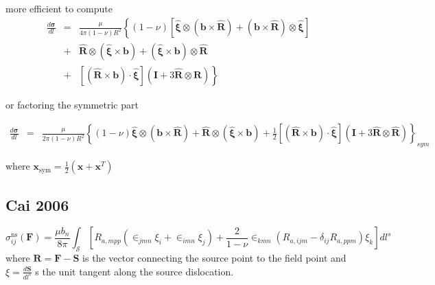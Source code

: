 \documentclass[10pt]{report}
\begin{document}
{more efficient to compute
\begin{eqnarray}
\frac{d\bm \sigma}{dl}&=&\frac{\mu}{4\pi (1-\nu)R^2}\left\{(1-\nu)\left[\hat{\bm\xi}\otimes(\bm b\times \hat{\bm R})+(\bm b\times \hat{\bm R})\otimes\hat{\bm\xi}\right]\right.\nonumber\\
&+&\left.\hat{\bm R}\otimes(\hat{\bm\xi}\times\bm b)+(\hat{\bm\xi}\times\bm b)\otimes\hat{\bm R}\right.\nonumber\\
&+&\left. \left[(\hat{\bm R}\times\bm b)\cdot\hat{\bm\xi}\right]\left(\bm I + 3\hat{\bm R}\otimes\hat{\bm R} \right)\right\}
\end{eqnarray}



or factoring the symmetric part

\begin{eqnarray}
\frac{d\bm \sigma}{dl}&=&\frac{\mu}{2\pi (1-\nu)R^2}\left\{(1-\nu)\hat{\bm\xi}\otimes(\bm b\times \hat{\bm R})
+\hat{\bm R}\otimes(\hat{\bm\xi}\times\bm b)
+\frac{1}{2}\left[(\hat{\bm R}\times\bm b)\cdot\hat{\bm\xi}\right]\left(\bm I + 3\hat{\bm R}\otimes\hat{\bm R} \right)\right\}_{sym}
\end{eqnarray}

where $\bm x_{\text{sym}}=\frac{1}{2}(\bm x+\bm x^T)$

\subsection{Cai 2006}
\begin{equation}
\sigma^\text{ns}_{ij}(\bm F)=\frac{\mu b_n}{8\pi}\int_\mathcal{S} \left[R_{a,mpp}\left(\in_{jmn}\xi_i+\in_{imn}\xi_j\right)+\frac{2}{1-\nu}\in_{kmn}\left(R_{a,ijm}-\delta_{ij}R_{a,ppm}\right)\xi_k\right]dl^s
\end{equation}
where $\bm R=\bm F-\bm S$ is the vector connecting the source point to the field point and $\xi=\frac{d\bm S}{dl^s}$ s the unit tangent along the source dislocation. 

}
\end{document}
